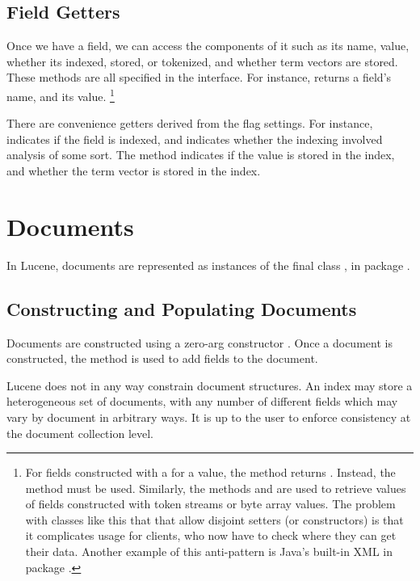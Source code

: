 \subsection{Field Getters}

Once we have a field, we can access the components of it such as its
name, value, whether its indexed, stored, or tokenized, and whether
term vectors are stored.  These methods are all specified in the
 interface.  For instance,  returns
a field's name, and  its value.%
%
\footnote{For fields constructed with a  for a value, the
  method  returns .  Instead, the
  method  must be used.  Similarly, the methods
   and  are used to
  retrieve values of fields constructed with token streams or byte
  array values.  The problem with classes like this that that allow
  disjoint setters (or constructors) is that it complicates usage for
  clients, who now have to check where they can get their data.
  Another example of this anti-pattern is Java's built-in XML
   in package .}
%

There are convenience getters derived from the flag settings.  For
instance,  indicates if the field is indexed, and
 indicates whether the indexing involved analysis
of some sort.  The method  indicates if the value is
stored in the index, and  whether the term
vector is stored in the index.

\section{Documents}

In Lucene, documents are represented as instances of the final class
, in package .

\subsection{Constructing and Populating Documents} 

Documents are constructed using a zero-arg constructor
.  Once a document is constructed, the method
 is used to add fields to the document.

Lucene does not in any way constrain document structures.  An index
may store a heterogeneous set of documents, with any number of
different fields which may vary by document in arbitrary ways.  It is
up to the user to enforce consistency at the document collection
level.  

